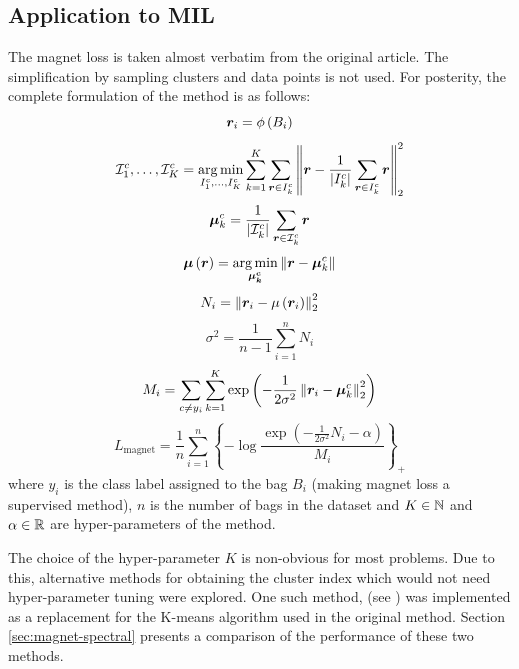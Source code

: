 \subsection{Application to MIL}
The magnet loss is taken almost verbatim from the original article. The simplification by sampling clusters and data points is not used. For posterity, the complete formulation of the method is as follows:
\[ \bm{r}_i = \phi \left( B_i \right) \]
\[ \mathcal{I}_1^c, \dots, \mathcal{I}_K^c = \operatorname*{arg\,min}_{I_1^c, \dots, I_K^c} \sum_{k = 1}^K \sum_{\bm{r} \in I_k^c} \left\lVert \bm{r} - \frac{1}{\left\lvert I_k^c \right\rvert} \sum_{\bm{r} \in I_k^c} \bm{r} \right\rVert_2^2  \]
\[ \bm{\mu}_k^c = \frac{1}{\left\lvert \mathcal{I}_k^c \right\rvert} \sum_{\bm{r} \in \mathcal{I}_k^c} \bm{r} \]
\[ \bm{\mu} \left( \bm{r} \right) = \operatorname*{arg\,min}_{\bm{\mu_k^c}} \left\lVert \bm{r} - \bm{\mu}_k^c \right\rVert \]
\[ N_i = \left\lVert \bm{r}_i - \mu \left( \bm{r}_i \right) \right\rVert_2^2 \]
\[ \sigma^2 = \frac{1}{n - 1} \sum_{i = 1}^n N_i \]
\[ M_i = \sum_{c \neq y_i} \sum_{k = 1}^K \exp \left( - \frac{1}{2 \sigma^2} \left\lVert \bm{r}_i - \bm{\mu}_k^c \right\rVert_2^2 \right) \]
\[ L_\mathrm{magnet} = \frac{1}{n} \sum_{i = 1}^n \left\{ - \log \frac{\exp \left( - \frac{1}{2 \sigma^2} N_i - \alpha \right)}{M_i} \right\}_+ \]
where \( y_i \) is the class label assigned to the bag \( B_i \) (making magnet loss a supervised method), \( n \) is the number of bags in the dataset and \( K \in \mathbb{N} \) and \( \alpha \in \mathbb{R} \) are hyper-parameters of the method.

The choice of the hyper-parameter \( K \) is non-obvious for most problems. Due to this, alternative methods for obtaining the cluster index which would not need hyper-parameter tuning were explored. One such method,  (see \cite{zelnik-manor_self-tuning_2005}) was implemented as a replacement for the K-means algorithm used in the original method. Section \ref{sec:magnet-spectral} presents a comparison of the performance of these two methods.
